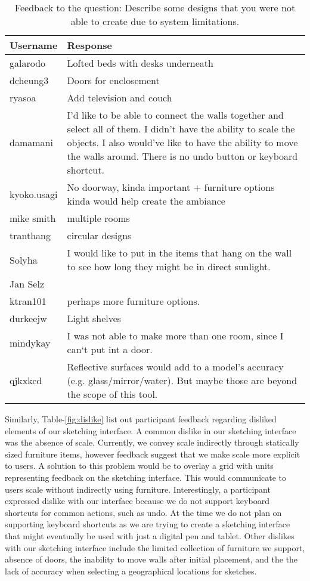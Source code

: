 \begin{table}[h]
\centering
\begin{tabular}{|p{}|p{}|}
\hline
\rowcolor[HTML]{EFEFEF} 
\textbf{Username} & \textbf{Response} \\ \hline
galarodo & Lofted beds with desks underneath \\ \hline
dcheung3 & Doors for enclosement \\ \hline
ryasoa & Add television and couch \\ \hline
damamani & I'd like to be able to connect the walls together and select all of them. I didn't have the ability to scale the objects.  I also would've like to have the ability to move the walls around. There is no undo button or keyboard shortcut. \\ \hline
kyoko.usagi & No doorway, kinda important + furniture options kinda would help create the ambiance \\ \hline
mike smith & multiple rooms \\ \hline
tranthang & circular designs \\ \hline
Solyha & I would like to put in the items that hang on the wall to see how long they might be in direct sunlight. \\ \hline
Jan Selz &  \\ \hline
ktran101 & perhaps more furniture options. \\ \hline
durkeejw & Light shelves \\ \hline
mindykay & I was not able to make more than one room, since I can`t put int a door. \\ \hline
qjkxkcd & Reflective surfaces would add to a model's accuracy (e.g. glass/mirror/water). But maybe those are beyond the scope of this tool. \\ \hline
\end{tabular}
\caption{Feedback to the question: Describe some designs that you were not able to create due  to system limitations. }
\label{fig:limitation}
\end{table}




Similarly, Table-\ref{fig:dislike} list out participant feedback regarding disliked elements of our sketching interface.
A common dislike in our sketching interface was the absence of scale.
Currently, we convey scale indirectly through statically sized furniture items, however feedback suggest that we make scale more explicit to users.
A solution to this problem would be to overlay a grid with units representing feedback on the sketching interface. This would communicate to users scale without indirectly using furniture.
Interestingly, a participant expressed dislike with our interface because we do not support keyboard shortcuts for common actions, such as undo.
At the time we do not plan on supporting keyboard shortcuts as we are trying to create a sketching interface that might eventually be used with just a digital pen and tablet.
Other dislikes with our sketching interface include the limited collection of furniture we support, absence of doors, the inability to move walls after initial placement, and the the lack of accuracy when selecting a geographical locations for sketches.

